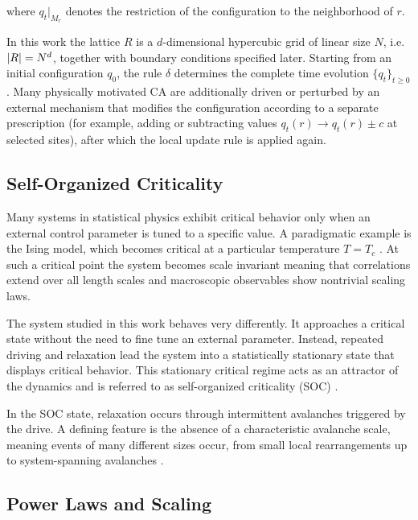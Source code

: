where $q_t|_{M_r}$ denotes the restriction of the configuration to the neighborhood of $r$.

In this work the lattice $R$ is a $d$-dimensional hypercubic grid of linear size $N$, i.e.\ $\abs{R}=N^d$, together with boundary conditions specified later. Starting from an initial configuration $q_0$, the rule $\delta$ determines the complete time evolution $\{q_t\}_{t\ge 0}$. Many physically motivated CA are additionally driven or perturbed by an external mechanism that modifies the configuration according to a separate prescription (for example, adding or subtracting values $q_t(r)\to q_t(r)\pm c$ at selected sites), after which the local update rule is applied again.

\subsection{Self-Organized Criticality}

Many systems in statistical physics exhibit critical behavior only when an external control parameter is tuned to a specific value. A paradigmatic example is the Ising model, which becomes critical at a particular temperature $T=T_c$ \cite{stanley1971introduction}.
At such a critical point the system becomes scale invariant meaning that correlations extend over all length scales and macroscopic observables show nontrivial scaling laws.

The system studied in this work behaves very differently. It approaches a critical state without the need to fine tune an external parameter. Instead, repeated driving and relaxation lead the system into a statistically stationary state that displays critical behavior. This stationary critical regime acts as an attractor of the dynamics and is referred to as self-organized criticality (SOC) \cite{bak1987self}.

In the SOC state, relaxation occurs through intermittent avalanches triggered by the drive. A defining feature is the absence of a characteristic avalanche scale, meaning events of many different sizes occur, from small local rearrangements up to system-spanning avalanches \cite{Dhar1990}.

\subsection{Power Laws and Scaling} \label{sec:power-laws}


